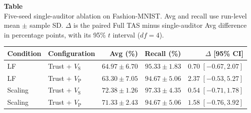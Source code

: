 \noindent\begin{minipage}{\textwidth}
\color{red}
\label{tab:tas_single_five_seed}
\textbf{Table~\thetable}\\
Five-seed single-auditor ablation on Fashion-MNIST. Avg and recall use run-level mean $\pm$ sample SD. $\Delta$ is the paired Full TAS minus single-auditor Avg difference in percentage points, with its 95\% $t$ interval ($df=4$).
\par\smallskip\centering\small
\setlength{\tabcolsep}{3pt}
\begin{tabular}{llrrr}
\toprule
Condition & Configuration & Avg (\%) & Recall (\%) & $\Delta$ [95\% CI] \\
\midrule
LF & Trust + $V_{\mathrm{S}}$ & $64.97\pm6.70$ & $95.33\pm1.83$ & $0.70\;[-0.67,2.07]$ \\
LF & Trust + $V_{\mathrm{P}}$ & $63.30\pm7.05$ & $94.67\pm5.06$ & $2.37\;[-0.53,5.27]$ \\
Scaling & Trust + $V_{\mathrm{S}}$ & $72.38\pm1.26$ & $97.33\pm4.35$ & $0.54\;[-0.71,1.78]$ \\
Scaling & Trust + $V_{\mathrm{P}}$ & $71.33\pm2.43$ & $94.67\pm5.06$ & $1.58\;[-0.76,3.92]$ \\
\bottomrule
\end{tabular}
\end{minipage}

